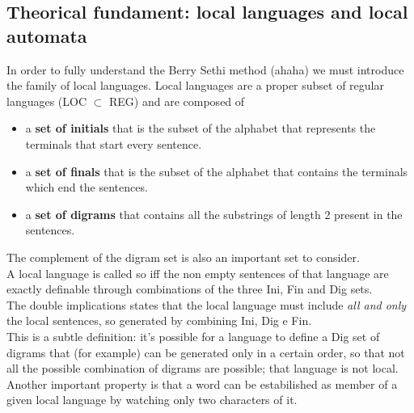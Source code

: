 \documentclass[10pt,a4paper]{article}
\begin{document}
			\subsection{Theorical fundament: local languages and local automata}
				In order to fully understand the Berry Sethi method (ahaha) we must introduce the family of local languages. Local languages are a proper subset of regular languages (LOC $\subset$ REG) and are composed of
				\begin{itemize}
					\item a \textbf{set of initials} that is the subset of the alphabet that represents the terminals that start every sentence.
					\item a \textbf{set of finals} that is the subset of the alphabet that contains the terminals which end the sentences.
					\item a \textbf{set of digrams} that contains all the substrings of length 2 present in the sentences.
				\end{itemize}
				The complement of the digram set is also an important set to consider.\\
				A local language is called so iff the non empty sentences of that language are exactly definable through combinations of the three Ini, Fin and Dig sets.\\
				The double implications states that the local language must include \emph{all and only} the local sentences, so generated by combining Ini, Dig e Fin.\\
				This is a subtle definition: it's possible for a language to define a Dig set of digrams that (for example) can be generated only in a certain order, so that not all the possible combination of digrams are possible; that language is not local.\\
				Another important property is that a word can be estabilished as member of a given local language by watching only two characters of it. 
\end{document}
